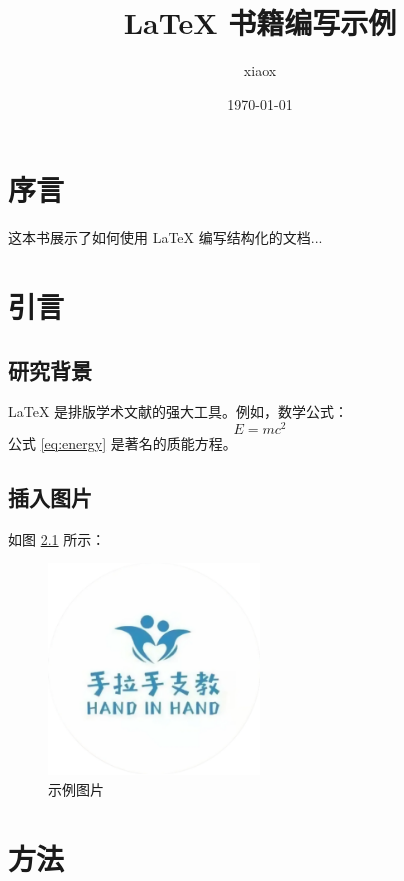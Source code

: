 \documentclass[12pt, a4paper, openany]{ctexbook} %
\title{LaTeX 书籍编写示例}
\author{xiaox}
\date{\today}
\begin{document}
\frontmatter
\maketitle %
\chapter{序言} %
这本书展示了如何使用 LaTeX 编写结构化的文档...

\tableofcontents %


\mainmatter
\chapter{引言}
\section{研究背景}
LaTeX 是排版学术文献的强大工具\cite{lamport1994latex}。例如，数学公式：
\begin{equation}
    E = mc^2 \label{eq:energy}
\end{equation}
公式 \ref{eq:energy} 是著名的质能方程。

\section{插入图片}
如图 \ref{fig:example} 所示：
\begin{figure}[htbp]
    \centering
    \includegraphics[width=0.5\textwidth]{images/example-image-logo.png} %
    \caption{示例图片}
    \label{fig:example}
\end{figure}

\chapter{方法}
\end{document}
